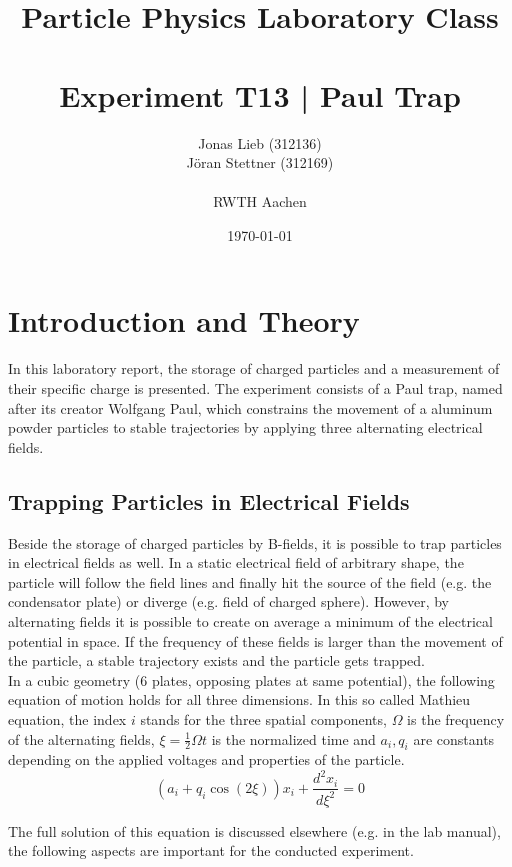 \documentclass[
	paper=A4,
	parskip=full,
	chapterprefix=true,
	11pt,
	headings=normal,
	bibliography=totoc,
	listof=totoc,
	titlepage=on,
]{scrreprt}
\date{\today}
\title{Particle Physics Laboratory Class \\ \quad \\ Experiment T13 | Paul Trap }
\author{Jonas Lieb (312136) \\ Jöran Stettner (312169) \\ \\  RWTH Aachen}
\begin{document}
\maketitle

\cleardoublepage

\setcounter{tocdepth}{2}
\tableofcontents

\cleardoublepage

\chapter{Introduction and Theory}

In this laboratory report, the storage of charged particles and a measurement of their specific charge is presented. The experiment consists of a Paul trap, named after its creator Wolfgang Paul, which constrains the movement of a aluminum powder particles to stable trajectories by applying three alternating electrical fields. 

\section{Trapping Particles in Electrical Fields}

Beside the storage of charged particles by B-fields, it is possible to trap particles in electrical fields as well. In a static electrical field of arbitrary shape, the particle will follow the field lines and finally hit the source of the field (e.g. the condensator plate) or diverge (e.g. field of charged sphere). However, by alternating fields it is possible to create on average a minimum of the electrical potential in space. If the frequency of these fields is larger than the movement of the particle, a stable trajectory exists and the particle gets trapped. \\

In a cubic geometry (6 plates, opposing plates at same potential), the following equation of motion holds for all three dimensions. In this so called Mathieu equation, the index $i$ stands for the three spatial components, $\Omega$ is the frequency of the alternating fields, $\xi = \frac{1}{2} \Omega t$ is the normalized time and $a_i, q_i$ are constants depending on the applied voltages and properties of the particle.
\begin{equation}
\label{eq:mathieu}
\left(a_i+q_i \cos(2 \xi)\right) x_i + \frac{d^2x_i}{d\xi^2} = 0
\end{equation}

The full solution of this equation is discussed elsewhere (e.g. in the lab manual\cite{Lab_manual}), the following aspects are important for the conducted experiment.
\end{document}
